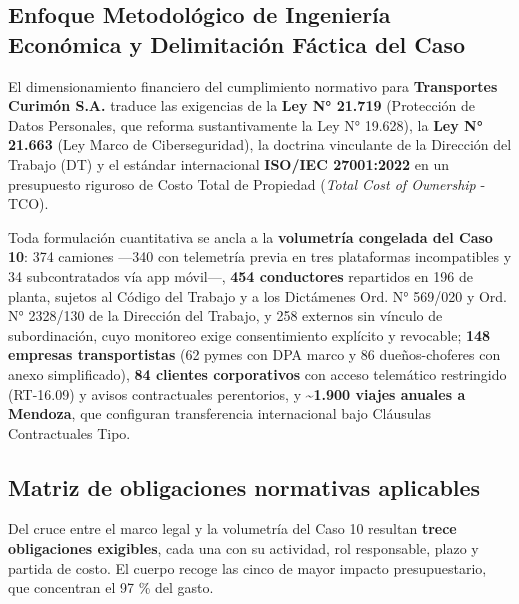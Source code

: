 \subsection{Enfoque Metodológico de Ingeniería Económica y Delimitación Fáctica del Caso}\label{enfoque-metodoluxf3gico-de-ingenieruxeda-econuxf3mica-y-delimitaciuxf3n-fuxe1ctica-del-caso}

El dimensionamiento financiero del cumplimiento normativo para \textbf{Transportes Curimón S.A.} traduce las exigencias de la \textbf{Ley N° 21.719} (Protección de Datos Personales, que reforma sustantivamente la Ley N° 19.628), la \textbf{Ley N° 21.663} (Ley Marco de Ciberseguridad), la doctrina vinculante de la Dirección del Trabajo (DT) y el estándar internacional \textbf{ISO/IEC 27001:2022} en un presupuesto riguroso de Costo Total de Propiedad (\emph{Total Cost of Ownership} - TCO).

Toda formulación cuantitativa se ancla a la \textbf{volumetría congelada del Caso 10}: 374 camiones ---340 con telemetría previa en tres plataformas incompatibles y 34 subcontratados vía app móvil---, \textbf{454 conductores} repartidos en 196 de planta, sujetos al Código del Trabajo y a los Dictámenes Ord. N° 569/020 y Ord. N° 2328/130 de la Dirección del Trabajo, y 258 externos sin vínculo de subordinación, cuyo monitoreo exige consentimiento explícito y revocable; \textbf{148 empresas transportistas} (62 pymes con DPA marco y 86 dueños-choferes con anexo simplificado), \textbf{84 clientes corporativos} con acceso telemático restringido (RT-16.09) y avisos contractuales perentorios, y \textbf{\textasciitilde1.900 viajes anuales a Mendoza}, que configuran transferencia internacional bajo Cláusulas Contractuales Tipo.

\subsection{Matriz de obligaciones normativas aplicables}\label{matriz-de-obligaciones-normativas-aplicables}

Del cruce entre el marco legal y la volumetría del Caso 10 resultan \textbf{trece obligaciones exigibles}, cada una con su actividad, rol responsable, plazo y partida de costo. El cuerpo recoge las cinco de mayor impacto presupuestario, que concentran el 97 \% del gasto.

